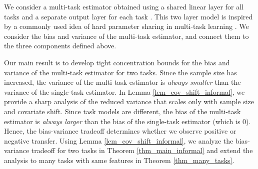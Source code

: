 
We consider a multi-task estimator obtained using a shared linear layer for all tasks and a separate output layer for each task \cite{WZR20}.
This two layer model is inspired by a commonly used idea of hard parameter sharing in multi-task learning \cite{R17,MTDNN19}.
We consider the bias and variance of the multi-task estimator, and connect them to the three components defined above.

Our main result is to develop tight concentration bounds for the bias and variance of the multi-task estimator for two tasks.
Since the sample size has increased, the variance of the multi-task estimator is \textit{always smaller} than the variance of the single-task estimator.
In Lemma \ref{lem_cov_shift_informal}, we provide a sharp analysis of the reduced variance that scales only with sample size and covariate shift.
Since task models are different, the bias of the multi-task estimator is \textit{always larger} than the bias of the single-task estimator (which is $0$).
Hence, the bias-variance tradeoff determines whether we observe positive or negative transfer.
Using Lemma \ref{lem_cov_shift_informal}, we analyze the bias-variance tradeoff for two tasks in Theorem \ref{thm_main_informal} and extend the analysis to many tasks with same features in Theorem \ref{thm_many_tasks}.

